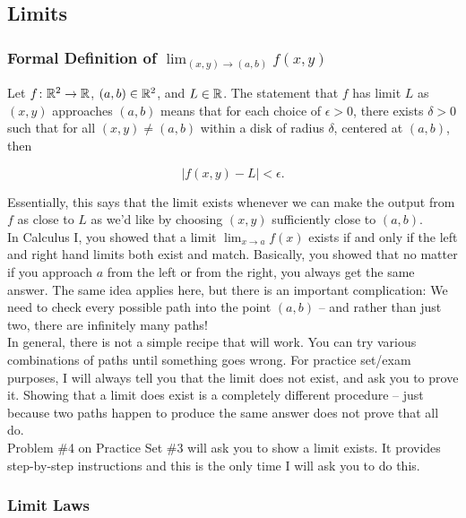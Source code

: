\subsection{Limits}

\subsubsection{Formal Definition of \(\lim_{(x, y) \to (a, b)} f(x, y)\)}

Let \(f \colon \mathbb{R}^{2} \to \mathbb{R}\), \((a, b) \in \mathbb{R}^{2}\), and \(L \in \mathbb{R}\). The statement that \(f\) has limit \(L\) as \((x, y)\) approaches \((a, b)\) means that for each choice of \(\epsilon > 0\), there exists \(\delta > 0\) such that for all \((x, y) \neq (a, b)\) within a disk of radius \(\delta\), centered at \((a, b)\), then

\[
|f(x, y) - L| < \epsilon.
\]

Essentially, this says that the limit exists whenever we can make the output from \(f\) as close to \(L\) as we’d like by choosing \((x, y)\) sufficiently close to \((a, b)\). \\

In Calculus I, you showed that a limit \(\lim_{x \to a} f(x)\) exists if and only if the left and right hand limits both exist and match. Basically, you showed that no matter if you approach \(a\) from the left or from the right, you always get the same answer. The same idea applies here, but there is an important complication: We need to check every possible path into the point \((a, b)\) – and rather than just two, there are infinitely many paths! \\

In general, there is not a simple recipe that will work. You can try various combinations of paths until something goes wrong. For practice set/exam purposes, I will always tell you that the limit does not exist, and ask you to prove it. Showing that a limit does exist is a completely different procedure – just because two paths happen to produce the same answer does not prove that all do. \\

Problem \#4 on Practice Set \#3 will ask you to show a limit exists. It provides step-by-step instructions and this is the only time I will ask you to do this.

\subsubsection{Limit Laws}

